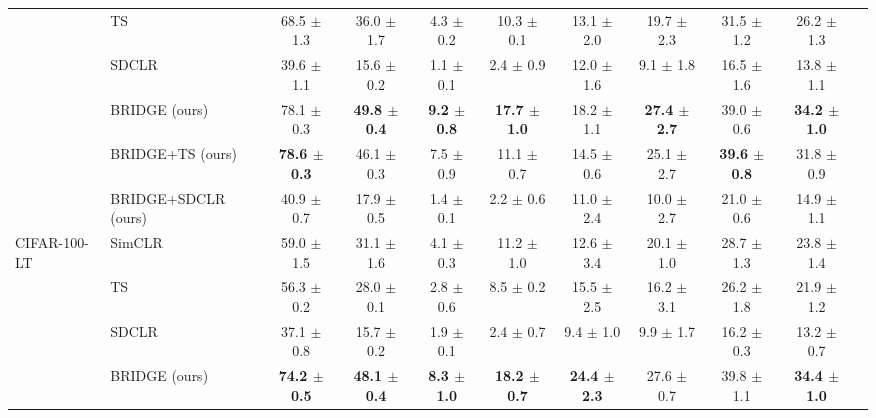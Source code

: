 \begin{table}[H]
\begin{adjustbox}{width=\textwidth}
\begin{tabular}{l l c c c c c c c c c}
 & TS & 68.5 {\scriptsize$\pm$ 1.3} & 36.0 {\scriptsize$\pm$ 1.7} & 4.3 {\scriptsize$\pm$ 0.2} & 10.3 {\scriptsize$\pm$ 0.1} & 13.1 {\scriptsize$\pm$ 2.0} & 19.7 {\scriptsize$\pm$ 2.3} & 31.5 {\scriptsize$\pm$ 1.2} & 26.2 {\scriptsize$\pm$ 1.3} \\
 & SDCLR & 39.6 {\scriptsize$\pm$ 1.1} & 15.6 {\scriptsize$\pm$ 0.2} & 1.1 {\scriptsize$\pm$ 0.1} & 2.4 {\scriptsize$\pm$ 0.9} & 12.0 {\scriptsize$\pm$ 1.6} & 9.1 {\scriptsize$\pm$ 1.8} & 16.5 {\scriptsize$\pm$ 1.6} & 13.8 {\scriptsize$\pm$ 1.1} \\
 & BRIDGE (ours) & 78.1 {\scriptsize$\pm$ 0.3} & \textbf{49.8 {\scriptsize$\pm$ 0.4}} & \textbf{9.2 {\scriptsize$\pm$ 0.8}} & \textbf{17.7 {\scriptsize$\pm$ 1.0}} & 18.2 {\scriptsize$\pm$ 1.1} & \textbf{27.4 {\scriptsize$\pm$ 2.7}} & 39.0 {\scriptsize$\pm$ 0.6} & \textbf{34.2 {\scriptsize$\pm$ 1.0}} \\
 & BRIDGE+TS (ours) & \textbf{78.6 {\scriptsize$\pm$ 0.3}} & 46.1 {\scriptsize$\pm$ 0.3} & 7.5 {\scriptsize$\pm$ 0.9} & 11.1 {\scriptsize$\pm$ 0.7} & 14.5 {\scriptsize$\pm$ 0.6} & 25.1 {\scriptsize$\pm$ 2.7} & \textbf{39.6 {\scriptsize$\pm$ 0.8}} & 31.8 {\scriptsize$\pm$ 0.9} \\
 & BRIDGE+SDCLR (ours) & 40.9 {\scriptsize$\pm$ 0.7} & 17.9 {\scriptsize$\pm$ 0.5} & 1.4 {\scriptsize$\pm$ 0.1} & 2.2 {\scriptsize$\pm$ 0.6} & 11.0 {\scriptsize$\pm$ 2.4} & 10.0 {\scriptsize$\pm$ 2.7} & 21.0 {\scriptsize$\pm$ 0.6} & 14.9 {\scriptsize$\pm$ 1.1} \\
\midrule
CIFAR-100-LT & SimCLR & 59.0 {\scriptsize$\pm$ 1.5} & 31.1 {\scriptsize$\pm$ 1.6} & 4.1 {\scriptsize$\pm$ 0.3} & 11.2 {\scriptsize$\pm$ 1.0} & 12.6 {\scriptsize$\pm$ 3.4} & 20.1 {\scriptsize$\pm$ 1.0} & 28.7 {\scriptsize$\pm$ 1.3} & 23.8 {\scriptsize$\pm$ 1.4} \\
 & TS & 56.3 {\scriptsize$\pm$ 0.2} & 28.0 {\scriptsize$\pm$ 0.1} & 2.8 {\scriptsize$\pm$ 0.6} & 8.5 {\scriptsize$\pm$ 0.2} & 15.5 {\scriptsize$\pm$ 2.5} & 16.2 {\scriptsize$\pm$ 3.1} & 26.2 {\scriptsize$\pm$ 1.8} & 21.9 {\scriptsize$\pm$ 1.2} \\
 & SDCLR & 37.1 {\scriptsize$\pm$ 0.8} & 15.7 {\scriptsize$\pm$ 0.2} & 1.9 {\scriptsize$\pm$ 0.1} & 2.4 {\scriptsize$\pm$ 0.7} & 9.4 {\scriptsize$\pm$ 1.0} & 9.9 {\scriptsize$\pm$ 1.7} & 16.2 {\scriptsize$\pm$ 0.3} & 13.2 {\scriptsize$\pm$ 0.7} \\
 & BRIDGE (ours) & \textbf{74.2 {\scriptsize$\pm$ 0.5}} & \textbf{48.1 {\scriptsize$\pm$ 0.4}} & \textbf{8.3 {\scriptsize$\pm$ 1.0}} & \textbf{18.2 {\scriptsize$\pm$ 0.7}} & \textbf{24.4 {\scriptsize$\pm$ 2.3}} & 27.6 {\scriptsize$\pm$ 0.7} & 39.8 {\scriptsize$\pm$ 1.1} & \textbf{34.4 {\scriptsize$\pm$ 1.0}} \\

\end{tabular}
\end{adjustbox}
\end{table}

